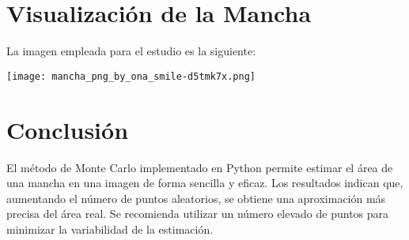 \documentclass[a4paper, 10pt]{article}
\begin{document}
\section{Visualización de la Mancha}
La imagen empleada para el estudio es la siguiente:

\texttt{[image: mancha\_png\_by\_ona\_smile-d5tmk7x.png]}

\section{Conclusión}
El método de Monte Carlo implementado en Python permite estimar el área de una mancha en una imagen de forma sencilla y eficaz. Los resultados indican que, aumentando el número de puntos aleatorios, se obtiene una aproximación más precisa del área real. Se recomienda utilizar un número elevado de puntos para minimizar la variabilidad de la estimación.
\end{document}
